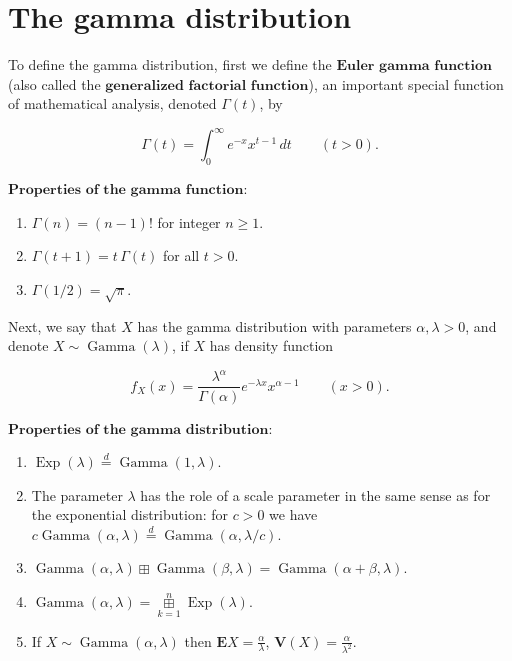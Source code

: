 \section{The gamma distribution}

To define the gamma distribution, first we define the
$\textbf{Euler gamma function}$ (also called the
$\textbf{generalized factorial function}$), an
important special function of mathematical analysis,
denoted $\Gamma(t)$, by

\[
\Gamma(t) = \int_0^\infty e^{-x} x^{t-1}\,dt \qquad (t>0).
\]

\noindent $\textbf{Properties of the gamma function:}$

\begin{enumerate}[label=\arabic*.]
\item $\Gamma(n)=(n-1)!$ for integer $n\ge1$.

\item $\Gamma(t+1) = t\, \Gamma(t)$ for all $t>0$.

\item $\Gamma(1/2)=\sqrt{\pi}$.
\end{enumerate}

\noindent Next, we say that $X$ has the gamma distribution with
parameters $\alpha, \lambda>0$, and denote
$X\sim \operatorname{Gamma}(\lambda)$, if $X$ has
density function

\[
f_X(x) = \frac{\lambda^\alpha}{\Gamma(\alpha)} e^{-\lambda x} x^{\alpha-1} \qquad (x>0).
\]

\noindent $\textbf{Properties of the gamma distribution:}$

\begin{enumerate}[label=\arabic*.]
\item $\operatorname{Exp}(\lambda) \stackrel{d}{=}
\operatorname{Gamma}(1,\lambda)$.

\item The parameter $\lambda$ has the role of a scale
parameter in the same sense as for the exponential
distribution: for $c>0$ we have
$c \operatorname{Gamma}(\alpha,\lambda)
\stackrel{d}{=} \operatorname{Gamma}(\alpha,
\lambda/c)$.

\item $\operatorname{Gamma}(\alpha,\lambda) \boxplus
\operatorname{Gamma}(\beta,\lambda) =
\operatorname{Gamma}(\alpha+\beta,\lambda)$.

\item $\operatorname{Gamma}(\alpha,\lambda) =
\mathop{\boxplus}\limits_{k=1}^n
\operatorname{Exp}(\lambda)$.

\item If $X\sim \operatorname{Gamma}(\alpha,\lambda)$ then
$\mathbf{E} X = \frac{\alpha}{\lambda}$,
$\mathbf{V}(X) = \frac{\alpha}{\lambda^2}$.
\end{enumerate}
